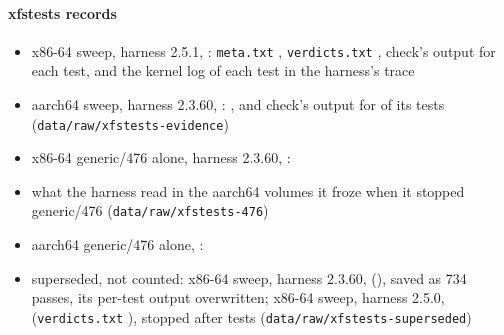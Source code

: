 \paragraph*{xfstests records}
\begin{itemize}
\item x86-64 sweep, harness 2.5.1, \texttt{\xfsXtag}: \texttt{meta.txt}
  \hash{\xfsXmetaSha}, \texttt{verdicts.txt} \hash{\xfsXverdictsSha},
  check's output for each test, and the kernel log of each test in the
  harness's trace
\item aarch64 sweep, harness 2.3.60, \texttt{\sweepAfullName}:
  \hash{\sweepAfullSha}, and check's output for \xfsAcheckOutputs{} of
  its tests (\texttt{data/raw/xfstests-evidence})
\item x86-64 generic/476 alone, harness 2.3.60, \texttt{\sweepXsoloName}: \hash{\sweepXsoloSha}
\item what the harness read in the aarch64 volumes it froze when it
  stopped generic/476 (\texttt{data/raw/xfstests-476})
\item aarch64 generic/476 alone, \texttt{\sweepAsoloName}: \hash{\sweepAsoloSha}
\item superseded, not counted: x86-64 sweep, harness 2.3.60,
  \texttt{\sweepXfullName} (\hash{\sweepXfullSha}), saved as 734 passes,
  its per-test output overwritten; x86-64 sweep, harness 2.5.0,
  \texttt{\xfsSupTag} (\texttt{verdicts.txt} \hash{\xfsSupVerdictsSha}),
  stopped after \xfsSupDone{} tests (\texttt{data/raw/xfstests-superseded})
\end{itemize}

